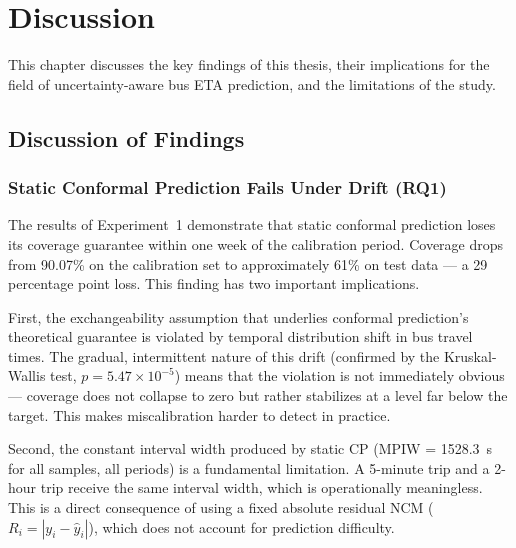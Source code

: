 
\chapter{Discussion}
\label{ch:discussion}

This chapter discusses the key findings of this thesis, their implications for the field of uncertainty-aware bus ETA prediction, and the limitations of the study.


\section{Discussion of Findings}
\label{sec:discussion_findings}

\subsection{Static Conformal Prediction Fails Under Drift (RQ1)}

The results of Experiment~1 demonstrate that static conformal prediction loses its coverage guarantee within one week of the calibration period. Coverage drops from 90.07\% on the calibration set to approximately 61\% on test data — a 29 percentage point loss. This finding has two important implications.

First, the exchangeability assumption that underlies conformal prediction's theoretical guarantee is violated by temporal distribution shift in bus travel times. The gradual, intermittent nature of this drift (confirmed by the Kruskal-Wallis test, $p = 5.47 \times 10^{-5}$) means that the violation is not immediately obvious — coverage does not collapse to zero but rather stabilizes at a level far below the target. This makes miscalibration harder to detect in practice.

Second, the constant interval width produced by static CP (MPIW = 1528.3~s for all samples, all periods) is a fundamental limitation. A 5-minute trip and a 2-hour trip receive the same interval width, which is operationally meaningless. This is a direct consequence of using a fixed absolute residual NCM ($R_i = |y_i - \hat{y}_i|$), which does not account for prediction difficulty.

